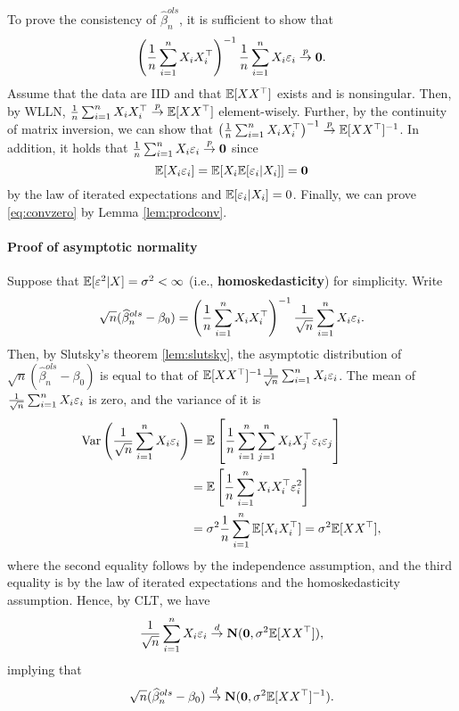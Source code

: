 \documentclass[11pt, A4paper, openany, uplatex]{book}
\begin{document}
To prove the consistency of $\hat \beta_n^{ols}$, it is sufficient to show that
\begin{align}\label{eq:convzero}
	\left(\frac{1}{n}\sum_{i = 1}^n X_i X_i^\top \right)^{-1}\frac{1}{n}\sum_{i = 1}^n X_i \varepsilon_i \overset{p}{\to} \mathbf{0}.
\end{align}
Assume that the data are IID and that $\mathbb{E}[XX^\top]$ exists and is nonsingular.
Then, by WLLN, $\frac{1}{n}\sum_{i = 1}^n X_i X_i^\top \overset{p}{\to} \mathbb{E}[XX^\top]$ element-wisely.
Further, by the continuity of matrix inversion, we can show that $\left(\frac{1}{n}\sum_{i = 1}^n X_i X_i^\top \right)^{-1} \overset{p}{\to} \mathbb{E}[XX^\top]^{-1}$.
In addition, it holds that $\frac{1}{n}\sum_{i = 1}^n X_i \varepsilon_i \overset{p}{\to} \mathbf{0}$ since
\[
	\mathbb{E}[X_i \varepsilon_i ] = \mathbb{E}[X_i \mathbb{E}[\varepsilon_i|X_i]] = \mathbf{0}
\]
by the law of iterated expectations and $\mathbb{E}[\varepsilon_i | X_i] = 0$.
Finally, we can prove \eqref{eq:convzero} by Lemma \ref{lem:prodconv}.

\paragraph{Proof of asymptotic normality}
Suppose that $\mathbb{E}[\varepsilon^2 | X ] = \sigma^2 < \infty$ (i.e., \textbf{homoskedasticity}) for simplicity.
Write
\[
	\sqrt{n}(\widehat \beta_n^{ols} - \beta_0) = \left(\frac{1}{n}\sum_{i = 1}^n X_i X_i^\top \right)^{-1}\frac{1}{\sqrt{n}}\sum_{i = 1}^n X_i \varepsilon_i.
\]
Then, by Slutsky's theorem \ref{lem:slutsky}, the asymptotic distribution of  $\sqrt{n}(\hat \beta_n^{ols} - \beta_0)$ is equal to that of $\mathbb{E}[XX^\top]^{-1}\frac{1}{\sqrt{n}}\sum_{i = 1}^n X_i \varepsilon_i$.
The mean of $\frac{1}{\sqrt{n}}\sum_{i = 1}^n X_i \varepsilon_i$ is zero, and the variance of it is
\begin{align*}
	\mathrm{Var}\left(\frac{1}{\sqrt{n}}\sum_{i = 1}^n X_i \varepsilon_i\right) 
	& = \mathbb{E}\left[ \frac{1}{n}\sum_{i = 1}^n\sum_{j = 1}^n X_i X_j^\top \varepsilon_i \varepsilon_j \right]\\
	& = \mathbb{E}\left[ \frac{1}{n}\sum_{i = 1}^n X_iX_i^\top \varepsilon^2_i \right]\\
	& = \sigma^2 \frac{1}{n}\sum_{i = 1}^n  \mathbb{E}[  X_iX_i^\top ] = \sigma^2 \mathbb{E}[  XX^\top ],
\end{align*}
where the second equality follows by the independence assumption, and the third equality is by the law of iterated expectations and the homoskedasticity assumption.
Hence, by CLT, we have
\[
	\frac{1}{\sqrt{n}}\sum_{i = 1}^n X_i \varepsilon_i \overset{d}{\to} \mathbf{N}(\mathbf{0}, \sigma^2 \mathbb{E}[XX^\top]),
\]
implying that 
\[
	\sqrt{n}(\widehat \beta_n^{ols} - \beta_0) \overset{d}{\to} \mathbf{N}(\mathbf{0}, \sigma^2 \mathbb{E}[XX^\top]^{-1}).
\]
\end{document}
